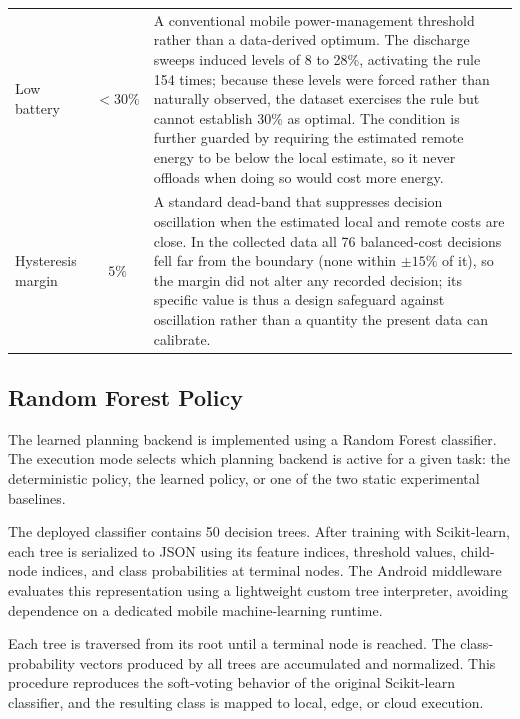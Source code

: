 \begin{table}[t]
\begin{tabularx}{\columnwidth}{p{2.0cm}cX}
\addlinespace

Low battery
& $<30\%$
& A conventional mobile power-management threshold rather than a data-derived
optimum. The discharge sweeps induced levels of 8 to 28\%, activating the rule
154 times; because these levels were forced rather than naturally observed, the
dataset exercises the rule but cannot establish 30\% as optimal. The condition
is further guarded by requiring the estimated remote energy to be below the
local estimate, so it never offloads when doing so would cost more energy. \\

\addlinespace

Hysteresis margin
& $5\%$
& A standard dead-band that suppresses decision oscillation when the estimated
local and remote costs are close. In the collected data all 76 balanced-cost
decisions fell far from the boundary (none within $\pm 15\%$ of it), so the
margin did not alter any recorded decision; its specific value is thus a design
safeguard against oscillation rather than a quantity the present data can
calibrate. \\

\bottomrule
\end{tabularx}
\end{table}


\subsection{Random Forest Policy}
\label{subsec:rf_policy}

The learned planning backend is implemented using a Random Forest classifier.
The execution mode selects which planning backend is active for a given task:
the deterministic policy, the learned policy, or one of the two static
experimental baselines.

The deployed classifier contains 50 decision trees. After training with
Scikit-learn, each tree is serialized to JSON using its feature indices,
threshold values, child-node indices, and class probabilities at terminal
nodes. The Android middleware evaluates this representation using a lightweight
custom tree interpreter, avoiding dependence on a dedicated mobile
machine-learning runtime.

Each tree is traversed from its root until a terminal node is reached. The
class-probability vectors produced by all trees are accumulated and normalized.
This procedure reproduces the soft-voting behavior of the original
Scikit-learn classifier, and the resulting class is mapped to local, edge, or
cloud execution.


